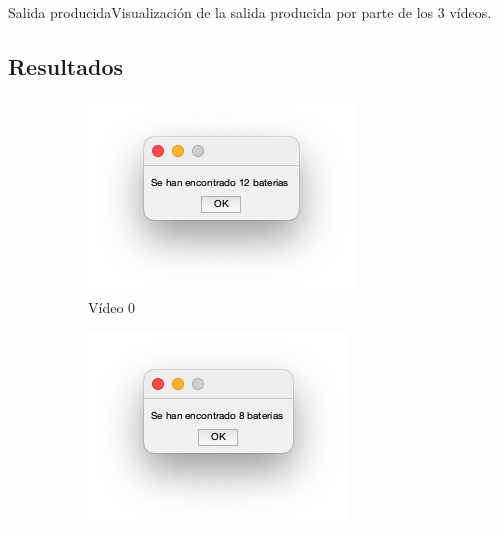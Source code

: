 \documentclass{beamer}
\begin{document}
\begin{frame}{Salida producida}{Visualización de la salida producida por parte de los 3 vídeos.}
\subsection{Resultados}
\begin{figure}
\begin{center}
\begin{subfigure}[t]{0.3\textwidth}
        \includegraphics[width=\textwidth]{img/S0.png}
        \caption{Vídeo 0}
    \end{subfigure}
    \begin{subfigure}[b]{0.3\textwidth}
        \includegraphics[width=\textwidth]{img/S1.png}

\end{subfigure}
\end{center}
\end{figure}
\end{frame}
\end{document}
